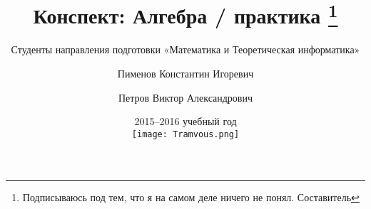 \documentclass[a4paper,titlepage]{article}
\author{Студенты направления подготовки «Математика и Теоретическая информатика»
  \and Пименов Константин Игоревич
  \and Петров Виктор Александрович}
\title{Конспект: Алгебра / практика
  \thanks{Подписываюсь под тем, что я на самом деле ничего не понял. Составитель}}
\date{2015--2016 учебный год \\ \vspace{1.3cm}
\texttt{[image: Tramvous.png]}}
\begin{document}
\maketitle

\tableofcontents
\vfill\eject















\end{document}
